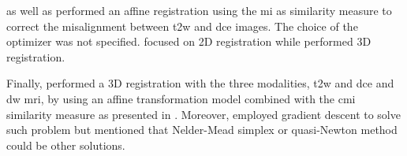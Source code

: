 \cite{Viswanath2008a,Viswanath2009} as well as \cite{Vos2008} performed an affine registration using the \ac{mi} as similarity measure to correct the misalignment between \ac{t2w} and \ac{dce} images. The choice of the optimizer was not specified. \cite{Viswanath2008a,Viswanath2009} focused on 2D registration while \cite{Vos2008} performed 3D registration.

Finally, \cite{Viswanath2011} performed a 3D registration with the three modalities, \ac{t2w} and \ac{dce} and \ac{dw} \ac{mri}, by using an affine transformation model combined with the \ac{cmi} similarity measure as presented in \cite{Chappelow2011}. Moreover, \cite{Chappelow2011} employed gradient descent to solve such problem but mentioned that Nelder-Mead simplex or quasi-Newton method could be other solutions.